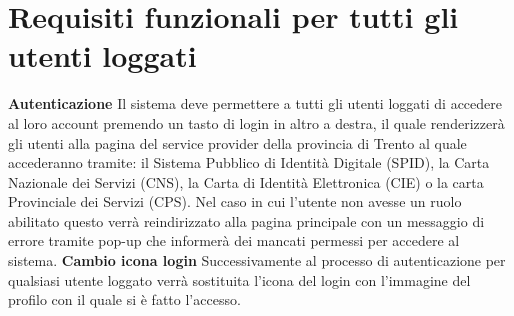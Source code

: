     \section{Requisiti funzionali per tutti gli utenti loggati}
        \begin{rfList}
            \rfItem \textbf{Autenticazione} Il sistema deve permettere a tutti gli utenti loggati di accedere al loro account premendo un tasto di login in altro a destra, il quale renderizzerà gli utenti alla pagina del service provider della provincia di Trento al quale accederanno tramite: il Sistema Pubblico di Identità Digitale (SPID), la Carta Nazionale dei Servizi (CNS), la Carta di Identità Elettronica (CIE) o la carta Provinciale dei Servizi (CPS). Nel caso in cui l'utente non avesse un ruolo abilitato questo verrà reindirizzato alla pagina principale con un messaggio di errore tramite pop-up che informerà dei mancati permessi per accedere al sistema.
            \rfItem \textbf{Cambio icona login} Successivamente al processo di autenticazione per qualsiasi utente loggato verrà sostituita l'icona del login con l'immagine del profilo con il quale si è fatto l'accesso.
        \end{rfList}     
